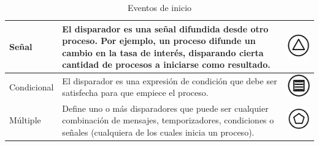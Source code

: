 \begin{table}[H]
\begin{tabular}{ |p{2cm}|p{9.5cm}|p{1.7cm} |  }
		\hline		
		{\small Señal } & {\small  El disparador es una señal difundida desde otro proceso. Por ejemplo, un proceso difunde un cambio en la tasa de interés, disparando cierta cantidad de procesos a iniciarse como resultado.}  &  \vspace{1mm} \hspace{2mm} \includegraphics[scale=0.2]{Capitulo2/imagenes/EventoS}\\ 
		
		\hline
		{\small Condicional } & {\small El disparador es una expresión de condición que debe ser satisfecha para que empiece el proceso. } & \vspace{1mm} \hspace{2mm} \includegraphics[scale=0.2]{Capitulo2/imagenes/Eventoc}\\
		
		\hline
		{\small Múltiple } & {\small Define uno o más disparadores que puede ser cualquier combinación de mensajes, temporizadores, condiciones o señales (cualquiera de los cuales inicia un proceso). } & \vspace{1mm} \hspace{2mm} \includegraphics[scale=0.2]{Capitulo2/imagenes/EventoMul}\\
		\hline
		\end{tabular}    
		\caption{Eventos de inicio \citep{stephena2009}}
		\label{tabla:Eventosdeinicio}
\end{table}

